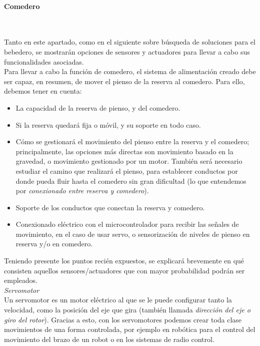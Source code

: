 \documentclass[12pt]{article}
\newcommand{\subsubsubsection}[1]{\paragraph{#1}\mbox{}\\}
\begin{document}
	\pagebreak
	
	\subsubsubsection{Comedero}
	\label{subsubsubsection: comedero busqueda}
	
	\noindent Tanto en este apartado, como en el siguiente sobre búsqueda de soluciones para el bebedero, se mostrarán opciones de sensores y actuadores para llevar a cabo sus funcionalidades asociadas.\\
	
	\noindent Para llevar a cabo la función de comedero, el sistema de alimentación creado debe ser capaz, en resumen, de mover el pienso de la reserva al comedero. Para ello, debemos tener en cuenta: 
	
	\begin{itemize}
		\item La capacidad de la reserva de pienso, y del comedero.
		\item Si la reserva quedará fija o móvil, y su soporte en todo caso.
		\item Cómo se gestionará el movimiento del pienso entre la reserva y el comedero; principalmente, las opciones más directas son movimiento basado en la gravedad, o movimiento gestionado por un motor. También será necesario estudiar el camino que realizará el pienso, para establecer conductos por donde pueda fluir hasta el comedero sin gran dificultad (lo que entendemos por \textit{conexionado entre reserva y comedero}).
		\item Soporte de los conductos que conectan la reserva y comedero.
		\item Conexionado eléctrico con el microcontrolador para recibir las señales de movimiento, en el caso de usar servo, o sensorización de niveles de pienso en reserva y/o en comedero.
	\end{itemize}
	
	\noindent Teniendo presente los puntos recién expuestos, se explicará brevemente en qué consisten aquellos sensores/actuadores que con mayor probabilidad podrán ser empleados. \\
	
	\noindent \textit{Servomotor} \\
	
	\noindent Un servomotor es un motor eléctrico al que se le puede configurar tanto la velocidad, como la posición del eje que gira (también llamada \textit{dirección del eje o giro del rotor}). Gracias a esto, con los servomotores podemos crear toda clase movimientos de una forma controlada, por ejemplo en robótica para el control del movimiento del brazo de un robot o en los sistemas de radio control. \\
	
\end{document}
